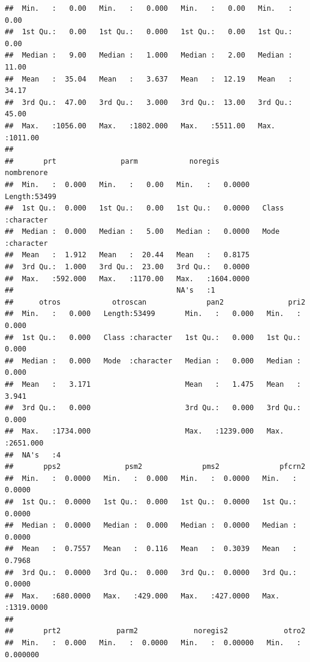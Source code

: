 \documentclass[
]{article}
\begin{document}
\begin{verbatim}
##  Min.   :   0.00   Min.   :   0.000   Min.   :   0.00   Min.   :   0.00  
##  1st Qu.:   0.00   1st Qu.:   0.000   1st Qu.:   0.00   1st Qu.:   0.00  
##  Median :   9.00   Median :   1.000   Median :   2.00   Median :  11.00  
##  Mean   :  35.04   Mean   :   3.637   Mean   :  12.19   Mean   :  34.17  
##  3rd Qu.:  47.00   3rd Qu.:   3.000   3rd Qu.:  13.00   3rd Qu.:  45.00  
##  Max.   :1056.00   Max.   :1802.000   Max.   :5511.00   Max.   :1011.00  
##                                                                          
##       prt               parm            noregis           nombrenore       
##  Min.   :  0.000   Min.   :   0.00   Min.   :   0.0000   Length:53499      
##  1st Qu.:  0.000   1st Qu.:   0.00   1st Qu.:   0.0000   Class :character  
##  Median :  0.000   Median :   5.00   Median :   0.0000   Mode  :character  
##  Mean   :  1.912   Mean   :  20.44   Mean   :   0.8175                     
##  3rd Qu.:  1.000   3rd Qu.:  23.00   3rd Qu.:   0.0000                     
##  Max.   :592.000   Max.   :1170.00   Max.   :1604.0000                     
##                                      NA's   :1                             
##      otros            otroscan              pan2               pri2         
##  Min.   :   0.000   Length:53499       Min.   :   0.000   Min.   :   0.000  
##  1st Qu.:   0.000   Class :character   1st Qu.:   0.000   1st Qu.:   0.000  
##  Median :   0.000   Mode  :character   Median :   0.000   Median :   0.000  
##  Mean   :   3.171                      Mean   :   1.475   Mean   :   3.941  
##  3rd Qu.:   0.000                      3rd Qu.:   0.000   3rd Qu.:   0.000  
##  Max.   :1734.000                      Max.   :1239.000   Max.   :2651.000  
##  NA's   :4                                                                  
##       pps2               psm2              pms2              pfcrn2         
##  Min.   :  0.0000   Min.   :  0.000   Min.   :  0.0000   Min.   :   0.0000  
##  1st Qu.:  0.0000   1st Qu.:  0.000   1st Qu.:  0.0000   1st Qu.:   0.0000  
##  Median :  0.0000   Median :  0.000   Median :  0.0000   Median :   0.0000  
##  Mean   :  0.7557   Mean   :  0.116   Mean   :  0.3039   Mean   :   0.7968  
##  3rd Qu.:  0.0000   3rd Qu.:  0.000   3rd Qu.:  0.0000   3rd Qu.:   0.0000  
##  Max.   :680.0000   Max.   :429.000   Max.   :427.0000   Max.   :1319.0000  
##                                                                             
##       prt2             parm2             noregis2             otro2          
##  Min.   :  0.000   Min.   :  0.0000   Min.   :  0.00000   Min.   : 0.000000  

\end{verbatim}
\end{document}
